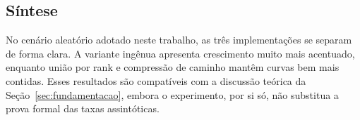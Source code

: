 \subsection{Síntese}

No cenário aleatório adotado neste trabalho, as três implementações se separam de forma clara. A variante ingênua apresenta crescimento muito mais acentuado, enquanto união por rank e compressão de caminho mantêm curvas bem mais contidas. Esses resultados são compatíveis com a discussão teórica da Seção~\ref{sec:fundamentacao}, embora o experimento, por si só, não substitua a prova formal das taxas assintóticas.
